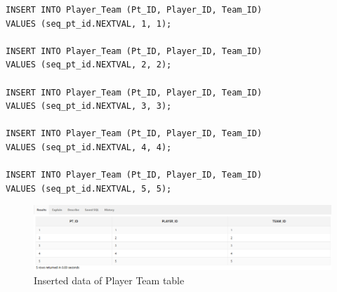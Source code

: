 \begin{lstlisting}[caption={Inserting data into Player\_Team tables},label={lst:insert_Player_Team}]
INSERT INTO Player_Team (Pt_ID, Player_ID, Team_ID)
VALUES (seq_pt_id.NEXTVAL, 1, 1);

INSERT INTO Player_Team (Pt_ID, Player_ID, Team_ID)
VALUES (seq_pt_id.NEXTVAL, 2, 2);

INSERT INTO Player_Team (Pt_ID, Player_ID, Team_ID)
VALUES (seq_pt_id.NEXTVAL, 3, 3);

INSERT INTO Player_Team (Pt_ID, Player_ID, Team_ID)
VALUES (seq_pt_id.NEXTVAL, 4, 4);

INSERT INTO Player_Team (Pt_ID, Player_ID, Team_ID)
VALUES (seq_pt_id.NEXTVAL, 5, 5);
\end{lstlisting}

\begin{figure}[H]
    \centering
    \includegraphics[width=1\textwidth]{images/TableData/PLAYER_TEAM.png}
    \caption{Inserted data of Player Team table}
\end{figure}